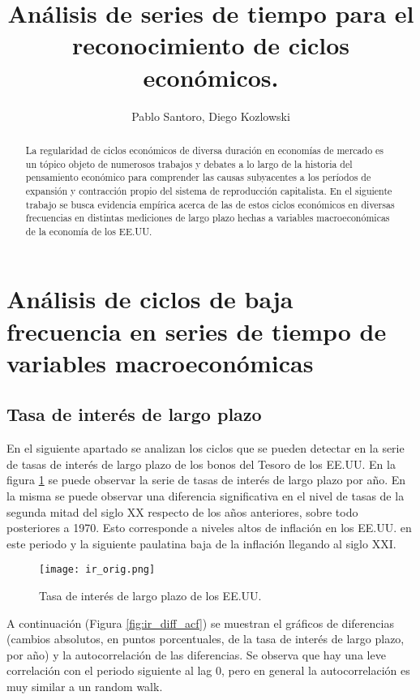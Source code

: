\documentclass[a4paper]{article}
\title{Análisis de series de tiempo para el reconocimiento de ciclos económicos.}
\author{Pablo Santoro, Diego Kozlowski}
\begin{document}
\maketitle

\begin{abstract}
	
La regularidad de ciclos económicos de diversa duración en economías de mercado es un tópico objeto de numerosos trabajos y debates a lo largo de la historia del pensamiento económico para comprender las causas subyacentes a los períodos de expansión y contracción propio del sistema de reproducción capitalista. En el siguiente trabajo se busca evidencia empírica acerca de las de estos ciclos económicos en diversas frecuencias en distintas mediciones de largo plazo hechas a variables macroeconómicas de la economía de los EE.UU.
\end{abstract}

\section{Análisis de ciclos de baja frecuencia en series de tiempo de variables macroeconómicas}
\subsection{Tasa de interés de largo plazo}

En el siguiente apartado se analizan los ciclos que se pueden detectar en la serie de tasas de interés de largo plazo de los bonos del Tesoro de los EE.UU.
En la figura \ref{fig:ir_orig} se puede observar la serie de tasas de interés de largo plazo por año. En la misma se puede observar una diferencia significativa en el nivel de tasas de la segunda mitad del siglo XX respecto de los años anteriores, sobre todo posteriores a 1970. Esto corresponde a niveles altos de inflación en los EE.UU. en este periodo y la siguiente paulatina baja de la inflación llegando al siglo XXI.

\begin{figure}[H]
	\centering
	\texttt{[image: ir\_orig.png]}
	
	\caption{Tasa de interés de largo plazo de los EE.UU.}
	\label{fig:ir_orig}
\end{figure}

A continuación (Figura \ref{fig:ir_diff_acf}) se muestran el gráficos de diferencias (cambios absolutos, en puntos porcentuales, de la tasa de interés de largo plazo, por año) y la autocorrelación de las diferencias. Se observa que hay una leve correlación con el periodo siguiente al lag 0, pero en general la autocorrelación es muy similar a un random walk.
\end{document}
